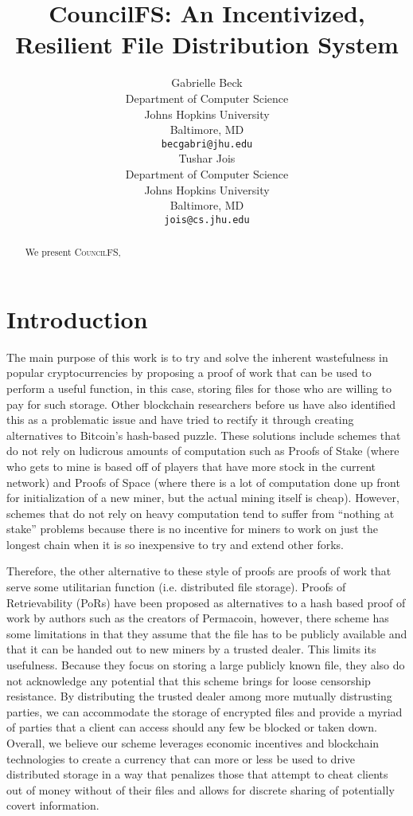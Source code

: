 \documentclass{article}
\title{CouncilFS: An Incentivized, Resilient File Distribution System}
\author{
  Gabrielle Beck \\
  Department of Computer Science\\
  Johns Hopkins University \\
 Baltimore, MD \\
  \texttt{becgabri@jhu.edu} \\
   \And
 Tushar Jois \\
  Department of Computer Science\\
  Johns Hopkins University\\
  Baltimore, MD \\
  \texttt{jois@cs.jhu.edu} \\
}
\begin{document}
\maketitle

\begin{abstract}
  We present \textsc{CouncilFS},
\end{abstract}




\section{Introduction}

The main purpose of this work is to try and solve the inherent wastefulness in
popular cryptocurrencies by proposing a proof of work that can be used to
perform a useful function, in this case, storing files for those who are willing
to pay for such storage. Other blockchain researchers before us have also
identified this as a problematic issue and have tried to rectify it through
creating alternatives to Bitcoin’s hash-based puzzle. These solutions include
schemes that do not rely on ludicrous amounts of computation such as Proofs of
Stake (where who gets to mine is based off of players that have more stock in
the current network) and Proofs of Space (where there is a lot of computation
done up front for initialization of a new miner, but the actual mining itself is
cheap). However, schemes that do not rely on heavy computation tend to suffer
from “nothing at stake” problems because there is no incentive for miners to
work on just the longest chain when it is so inexpensive to try and extend other
forks.

Therefore, the other alternative to these style of proofs are proofs of
work that serve some utilitarian function (i.e. distributed file storage).
Proofs of Retrievability (PoRs) have been proposed as alternatives to a hash
based proof of work by authors such as the creators of Permacoin, however, there
scheme has some limitations in that they assume that the file has to be publicly
available and that it can be handed out to new miners by a trusted dealer. This
limits its usefulness. Because they focus on storing a large publicly known
file, they also do not acknowledge any potential that this scheme brings for
loose censorship resistance. By distributing the trusted dealer among more
mutually distrusting parties, we can accommodate the storage of encrypted files
and provide a myriad of parties that a client can access should any few be
blocked or taken down. Overall, we believe our scheme leverages economic
incentives and blockchain technologies to create a currency that can more or
less be used to drive distributed storage in a way that penalizes those that
attempt to cheat clients out of money without of their files and allows for
discrete sharing of potentially covert information.
\end{document}
